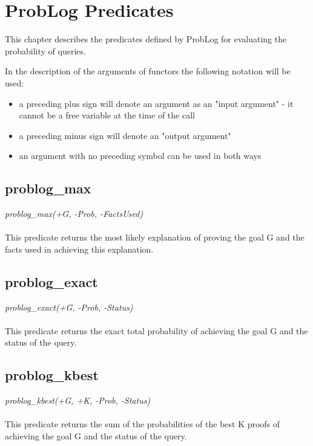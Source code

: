 \documentclass[a4paper,12pt]{article}
\begin{document}
\section{ProbLog Predicates}

This chapter describes the predicates defined by ProbLog for evaluating the probability of queries.

In the description of the arguments of functors the following notation will be used:

\begin{itemize}
\item a preceding plus sign will denote an argument as an "input argument" - it cannot be a free variable at the time of the call
\item a preceding minus sign will denote an "output argument"
\item an argument with no preceding symbol can be used in both ways
\end{itemize}

\subsection{problog\_max}
\textit{problog\_max(+G, -Prob, -FactsUsed)}
\paragraph{}
This predicate returns the most likely explanation of proving the goal G and the facts used in achieving this explanation.

\subsection{problog\_exact}
\textit{problog\_exact(+G, -Prob, -Status)}
\paragraph{}
This predicate returns the exact total probability of achieving the goal G and the status of the query.

\subsection{problog\_kbest}
\textit{problog\_kbest(+G, +K, -Prob, -Status)}
\paragraph{}
This predicate returns the sum of the probabilities of the best K proofs of achieving the goal G and the status of the query.
\end{document}

